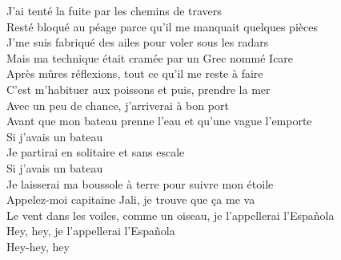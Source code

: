 \documentclass{novel}
\begin{document}
\begin{multicols}{2}
J'ai tenté la fuite par les chemins de travers \\
Resté bloqué au péage parce qu'il me manquait quelques pièces \\
J'me suis fabriqué des ailes pour voler sous les radars \\
Mais ma technique était cramée par un Grec nommé Icare \\
Après mûres réflexions, tout ce qu'il me reste à faire \\
C'est m'habituer aux poissons et puis, prendre la mer \\
Avec un peu de chance, j'arriverai à bon port \\
Avant que mon bateau prenne l'eau et qu'une vague l'emporte \\

Si j'avais un bateau \\
Je partirai en solitaire et sans escale \\
Si j'avais un bateau \\
Je laisserai ma boussole à terre pour suivre mon étoile \\
Appelez-moi capitaine Jali, je trouve que ça me va \\
Le vent dans les voiles, comme un oiseau, je l'appellerai l'Española \\
Hey, hey, je l'appellerai l'Española \\
Hey-hey, hey
\end{multicols}
\end{document}
